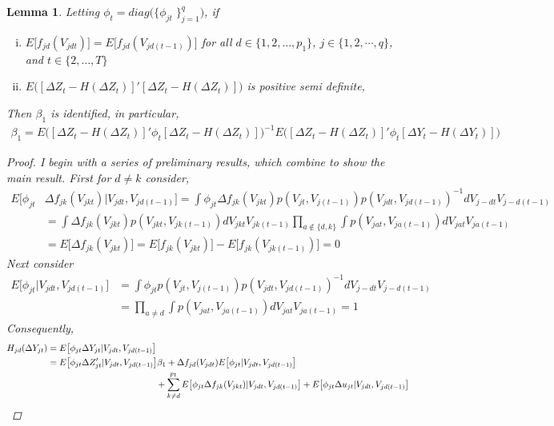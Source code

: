 \documentclass[10pt]{article}
\newtheorem{lemma}{Lemma}
\begin{document}
\begin{lemma}
Letting $\phi_{t} = diag\big( \{\phi_{jt}\;\}_{j=1}^q \big)$, if
\begin{enumerate}[i.)] 
\item $E\big[ f_{jd}(V_{jdt})\big] = E\big[ f_{jd}(V_{jd(t-1)}) \big] 
$ for all $d\in \{1,2, \ldots , p_1\}$, $j\in \{1,2, \cdots , q\}$, and $t\in \{2, \ldots , T\}$
%
\item $E \Big( [\Delta Z_t - H(\Delta Z_t)]' [\Delta Z_t - H(\Delta Z_t)] \Big)$ is positive semi definite,
%
\end{enumerate}
Then $\beta_1$ is identified, in particular,
\begin{align*} 
\beta_1 = E \Big( [\Delta Z_t - H(\Delta Z_t)]' \phi_{t} [\Delta Z_t - H(\Delta Z_t)] \Big)^{-1}E \Big( [\Delta Z_t - H(\Delta Z_t)]' \phi_{t} [\Delta Y_t - H(\Delta Y_t)] \Big)
\end{align*} 
%
\begin{proof} I begin with a series of preliminary results, which combine to show the main result. First for $d \neq k$ consider,
\begin{align*} 
E \big[ \phi_{jt} & \Delta f_{jk}(V_{jkt}) |V_{jdt},V_{jd(t-1)} \big]  = \int \phi_{jt} \Delta f_{jk}(V_{jkt}) p(V_{jt},V_{j(t-1)})p(V_{jdt},V_{jd(t-1)})^{-1}dV_{j-dt}V_{j-d(t-1)} \\
%
& = \int \Delta f_{jk}(V_{jkt}) p(V_{jkt},V_{jk(t-1)}) dV_{jkt} V_{jk(t-1)}\prod_{a \notin\{d,k\}}\int p(V_{jat},V_{ja(t-1)}) dV_{jat} V_{ja(t-1)} \\
& = E\big[ \Delta f_{jk}(V_{jkt}) \big] = E\big[ f_{jk}(V_{jkt}) \big]  - E\big[ f_{jk}(V_{jk(t-1)}) \big] = 0
\end{align*}
Next consider 
\begin{align*} 
E\big[\phi_{jt} | V_{jdt},V_{jd(t-1)}\big] &= \int \phi_{jt}p(V_{jt},V_{j(t-1)})p(V_{jdt},V_{jd(t-1)})^{-1}dV_{j-dt}V_{j-d(t-1)} \\
%
&= \prod_{a \neq d }\int p(V_{jat},V_{ja(t-1)}) dV_{jat} V_{ja(t-1)}  = 1
\end{align*}
Consequently, 
\begin{align*} 
H_{jd}(\Delta Y_{jt}) &= E\big[ \phi_{jt} \Delta Y_{jt} | V_{jdt},V_{jd(t-1)} \big] \\
%
& =E \big[ \phi_{jt} \Delta Z_{jt}' | V_{jdt},V_{jd(t-1)} \big]\beta_1 + \Delta f_{jd}(V_{jdt})E\big[\phi_{jt} | V_{jdt},V_{jd(t-1)}\big] \\
%
 &\hspace{4.3cm} + \sum_{k\neq d}^{p_1} E \big[ \phi_{jt} \Delta f_{jk}(V_{jkt}) | V_{jdt},V_{jd(t-1)} \big] + E\big[  \phi_{jt}\Delta u_{jt} | V_{jdt},V_{jd(t-1)} \big]  \\

\end{align*}
\end{proof}
\end{lemma}
\end{document}
